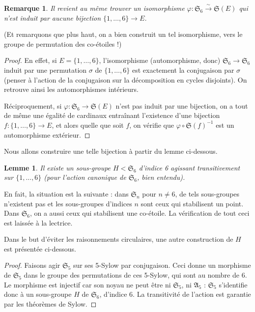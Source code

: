 \documentclass[a4paper, 11pt]{article}
\def\Sigmap{\mathfrak{S}}
\newtheorem*{lemma}{Lemme}
\newtheorem*{remark}{Remarque}
\begin{document}
\begin{remark}
  Il revient au même trouver un isomorphisme $\varphi : \Sigmap_6
  \xrightarrow{\sim} \Sigmap(E)$ qui n'est induit par aucune bijection
  $\{1,\ldots,6\} \to E$.
\end{remark}
(Et remarquons que plus haut, on a bien construit un tel isomorphisme, vers le
groupe de permutation des co-étoiles !)
\begin{proof}
  En effet, si $E = \{1,\ldots,6\}$, l'isomorphisme (automorphisme, donc)
  $\Sigmap_6 \to \Sigmap_6$ induit par une permutation $\sigma$ de
  $\{1,\ldots,6\}$ est exactement la conjugaison par $\sigma$ (penser à l'action
  de la conjugaison sur la décomposition en cycles disjoints). On retrouve ainsi
  les automorphismes intérieurs.

  Réciproquement, si $\varphi : \Sigmap_6 \to \Sigmap(E)$ n'est pas induit par une
  bijection, on a tout de même une égalité de cardinaux entraînant l'existence
  d'une bijection $f : \{1,\ldots,6\} \to E$, et alors quelle que soit $f$, on
  vérifie que $\varphi \circ \Sigmap(f)^{-1}$ est un automorphisme extérieur.
\end{proof}

Nous allons construire une telle bijection à partir du lemme ci-dessous.

\begin{lemma}
  Il existe un sous-groupe $H < \Sigmap_6$ d'indice 6 agissant transitivement
  sur $\{1,\ldots,6\}$ (pour l'action canonique de $\Sigmap_6$, bien entendu).
\end{lemma}
En fait, la situation est la suivante : dans $\Sigmap_n$ pour $n \neq 6$, de
tels sous-groupes n'existent pas et les sous-groupes d'indices $n$ sont ceux qui
stabilisent un point. Dans $\Sigmap_6$, on a aussi ceux qui stabilisent une
co-étoile. La vérification de tout ceci est laissée à la lectrice.

Dans le but d'éviter les raisonnements circulaires, une autre construction de
$H$ est présentée ci-dessous.
\begin{proof}
  Faisons agir $\Sigmap_5$ sur ses 5-Sylow par conjugaison. Ceci donne un
  morphisme de $\Sigmap_5$ dans le groupe des permutations de ces 5-Sylow, qui
  sont au nombre de 6. Le morphisme est injectif car son noyau ne peut être ni
  $\Sigmap_5$, ni $\mathfrak{A}_5$ : $\Sigmap_5$ s'identifie donc à un
  sous-groupe $H$ de $\Sigmap_6$, d'indice 6. La transitivité de l'action est
  garantie par les théorèmes de Sylow.
\end{proof}
\end{document}

